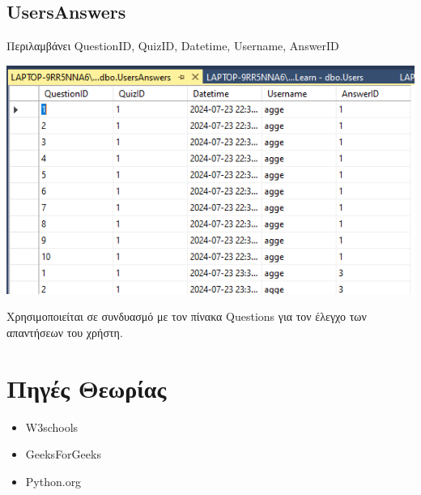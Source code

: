 \documentclass[12pt]{article}
\newcommand{\en}[1]{\foreignlanguage{English}{#1}}
\begin{document}
\subsection*{\en{UsersAnswers}}

Περιλαμβάνει \en{QuestionID, QuizID, Datetime, Username, AnswerID}



\begin{center}
    
    \includegraphics[width=0.8\linewidth]{usersanswersdb.png}
\end{center}


Χρησιμοποιείται σε συνδυασμό με τον πίνακα \en{Questions} για τον έλεγχο των απαντήσεων του χρήστη.

\newpage
 \section*{Πηγές Θεωρίας}

\begin{itemize}
    \item \en{W3schools}
    \item \en{GeeksForGeeks}
    \item \en{Python.org}
\end{itemize}
\end{document}

